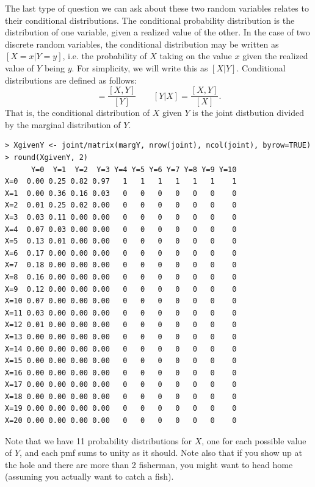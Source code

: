 The last type of question we can ask about these two random variables
relates to their conditional distributions. The
conditional probability distribution is the distribution of one
variable, given a realized value of the other. In the case of two discrete random
variables, the conditional distribution may be written as
$[X=x|Y=y]$, i.e. the probability of $X$ taking on the value $x$
given the realized value of $Y$ being $y$. For simplicity, we will
write this as $[X|Y]$. Conditional distributions are defined as follows:
\begin{equation*}
  [X|Y] = \frac{[X,Y]}{[Y]} \qquad [Y|X] = \frac{[X,Y]}{[X]}.
\end{equation*}
That is, the conditional distribution of $X$ given $Y$ is the joint
distbution divided by the marginal distribution of $Y$.
\begin{verbatim}
> XgivenY <- joint/matrix(margY, nrow(joint), ncol(joint), byrow=TRUE)
> round(XgivenY, 2)
      Y=0  Y=1  Y=2  Y=3 Y=4 Y=5 Y=6 Y=7 Y=8 Y=9 Y=10
X=0  0.00 0.25 0.82 0.97   1   1   1   1   1   1    1
X=1  0.00 0.36 0.16 0.03   0   0   0   0   0   0    0
X=2  0.01 0.25 0.02 0.00   0   0   0   0   0   0    0
X=3  0.03 0.11 0.00 0.00   0   0   0   0   0   0    0
X=4  0.07 0.03 0.00 0.00   0   0   0   0   0   0    0
X=5  0.13 0.01 0.00 0.00   0   0   0   0   0   0    0
X=6  0.17 0.00 0.00 0.00   0   0   0   0   0   0    0
X=7  0.18 0.00 0.00 0.00   0   0   0   0   0   0    0
X=8  0.16 0.00 0.00 0.00   0   0   0   0   0   0    0
X=9  0.12 0.00 0.00 0.00   0   0   0   0   0   0    0
X=10 0.07 0.00 0.00 0.00   0   0   0   0   0   0    0
X=11 0.03 0.00 0.00 0.00   0   0   0   0   0   0    0
X=12 0.01 0.00 0.00 0.00   0   0   0   0   0   0    0
X=13 0.00 0.00 0.00 0.00   0   0   0   0   0   0    0
X=14 0.00 0.00 0.00 0.00   0   0   0   0   0   0    0
X=15 0.00 0.00 0.00 0.00   0   0   0   0   0   0    0
X=16 0.00 0.00 0.00 0.00   0   0   0   0   0   0    0
X=17 0.00 0.00 0.00 0.00   0   0   0   0   0   0    0
X=18 0.00 0.00 0.00 0.00   0   0   0   0   0   0    0
X=19 0.00 0.00 0.00 0.00   0   0   0   0   0   0    0
X=20 0.00 0.00 0.00 0.00   0   0   0   0   0   0    0
\end{verbatim}
Note that we have 11 probability distributions for $X$, one for each
possible value of $Y$, and each pmf sums to unity as it should. Note
also that if you show up at the hole and there are more than 2
fisherman, you might want to head home (assuming you actually want to
catch a fish).

